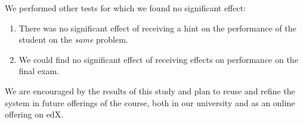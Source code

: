 \documentclass{llncs2e/llncs}
\begin{document}
We performed other tests for which we found no significant effect:
\begin{enumerate}
\item There was no significant effect of receiving a hint on the
  performance of the student on the {\em same} problem.
\item We could find no significant effect of receiving effects on
  performance on the final exam.
\end{enumerate}

We are encouraged by the results of this study and plan to reuse and
refine the system in future offerings of the course, both in our
university and as an online offering on edX.



\end{document}
